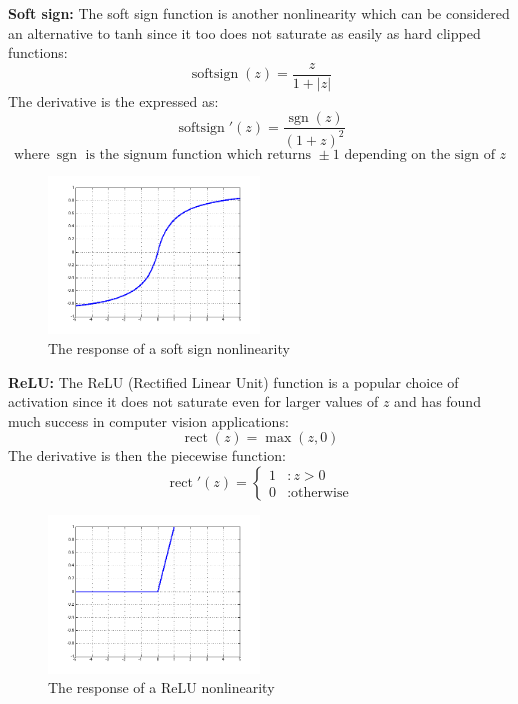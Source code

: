 \textbf{Soft sign:}
The soft sign function is another nonlinearity which can be considered an alternative to tanh since it too does not saturate as easily as hard clipped functions:
$$\operatorname{softsign}(z) = \frac{z}{1 + |z|}$$
The derivative is the expressed as:
$$\operatorname{softsign}'(z) = \frac{\operatorname{sgn}(z)}{(1 + z)^2}$$
$$\text{where}~\operatorname{sgn} \text{ is the signum function which returns }\pm1\text{ depending on the sign of }z$$
\begin{figure}[H]%
  \center%
    \includegraphics[width=0.5\textwidth]{images/eman/graph_softsign.png}
  \caption[The response of a soft sign nonlinearity]{The response of a soft sign nonlinearity}
  \label{fig:graph_softsign}
\end{figure}
\textbf{ReLU:} The ReLU (Rectified Linear Unit) function is a popular choice of activation since it does not saturate even for larger values of $z$ and has found much success in computer vision applications:
$$\operatorname{rect}(z) = \operatorname{max}(z, 0)$$
The derivative is then the piecewise function:
\begin{displaymath}
    \operatorname{rect}'(z) = \left\{
     \begin{array}{cl}
       1 & : z > 0\\
       0 & : \text{otherwise}
     \end{array}
   \right.
\end{displaymath}
\begin{figure}[H]%
  \center%
    \includegraphics[width=0.5\textwidth]{images/eman/graph_relu.png}
  \caption[The response of a ReLU nonlinearity]{The response of a ReLU nonlinearity}
  \label{fig:graph_relu}
\end{figure}
